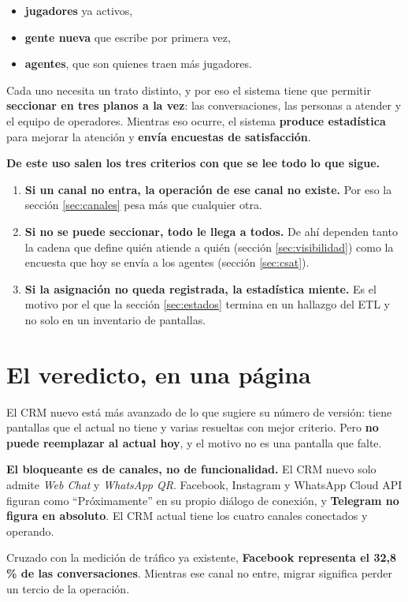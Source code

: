 \documentclass[11pt,a4paper]{article}
\begin{document}
\begin{itemize}
  \item \textbf{jugadores} ya activos,
  \item \textbf{gente nueva} que escribe por primera vez,
  \item \textbf{agentes}, que son quienes traen más jugadores.
\end{itemize}

Cada uno necesita un trato distinto, y por eso el sistema tiene que permitir
\textbf{seccionar en tres planos a la vez}: las conversaciones, las personas a atender y
el equipo de operadores. Mientras eso ocurre, el sistema \textbf{produce estadística}
para mejorar la atención y \textbf{envía encuestas de satisfacción}.

\begin{nota}
\textbf{De este uso salen los tres criterios con que se lee todo lo que sigue.}

\begin{enumerate}
  \item \textbf{Si un canal no entra, la operación de ese canal no existe.} Por eso la
        sección \ref{sec:canales} pesa más que cualquier otra.
  \item \textbf{Si no se puede seccionar, todo le llega a todos.} De ahí dependen tanto la
        cadena que define quién atiende a quién (sección \ref{sec:visibilidad}) como la
        encuesta que hoy se envía a los agentes (sección \ref{sec:csat}).
  \item \textbf{Si la asignación no queda registrada, la estadística miente.} Es el
        motivo por el que la sección \ref{sec:estados} termina en un hallazgo del ETL y
        no solo en un inventario de pantallas.
\end{enumerate}
\end{nota}

\section{El veredicto, en una página}

El CRM nuevo está más avanzado de lo que sugiere su número de versión: tiene
pantallas que el actual no tiene y varias resueltas con mejor criterio. Pero
\textbf{no puede reemplazar al actual hoy}, y el motivo no es una pantalla que falte.

\begin{alerta}
\textbf{El bloqueante es de canales, no de funcionalidad.} El CRM nuevo solo admite
\emph{Web Chat} y \emph{WhatsApp QR}. Facebook, Instagram y WhatsApp Cloud API figuran
como ``Próximamente'' en su propio diálogo de conexión, y \textbf{Telegram no figura
en absoluto}. El CRM actual tiene los cuatro canales conectados y operando.

\vspace{0.4em}
Cruzado con la medición de tráfico ya existente, \textbf{Facebook representa el
32,8\,\% de las conversaciones}. Mientras ese canal no entre, migrar significa perder
un tercio de la operación.
\end{alerta}
\end{document}

